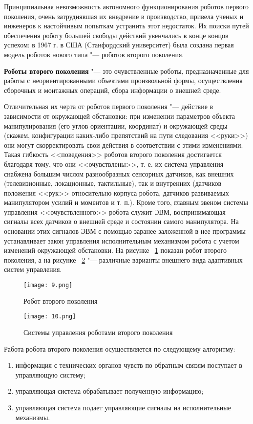 \documentclass[bachelor, och, referat]{SCWorks}
\begin{document}
Принципиальная невозможность автономного функционирования роботов первого
поколения, очень затруднявшая их внедрение в производство, привела ученых и
инженеров к настойчивым попыткам устранить этот недостаток. Их поиски путей
обеспечения роботу большей свободы действий увенчались в конце концов успехом: в
1967 г. в США (Станфордский университет) была создана первая модель роботов
нового типа "--- роботов второго поколения.

\textbf{Роботы второго поколения} "--- это очувствленные роботы, предназначенные
для работы с неориентированными объектами произвольной формы, осуществления
сборочных и монтажных операций, сбора информации о внешней среде.

Отличительная их черта от роботов первого поколения "--- действие в зависимости
от окружающей обстановки: при изменении параметров объекта манипулирования (его
углов ориентации, координат) и окружающей среды (скажем, конфигурации каких-либо
препятствий на пути следования <<руки>>) они могут скорректировать свои действия
в соответствии с этими изменениями. Такая гибкость <<поведения>> роботов второго
поколения достигается благодаря тому, что они <<очувствлены>>, т. е. их система
управления снабжена большим числом разнообразных сенсорных датчиков, как внешних
(телевизионные, локационные, тактильные), так и внутренних (датчиков положения
<<рук>> относительно корпуса робота, датчиков развиваемых манипулятором усилий и
моментов и т. п.). Кроме того, главным звеном системы управления
<<очувствленного>> робота служит ЭВМ, воспринимающая сигналы всех датчиков о
внешней среде и состоянии самого манипулятора. На основании этих сигналов ЭВМ с
помощью заранее заложенной в нее программы устанавливает закон управления
исполнительным механизмом робота с учетом изменений окружающей обстановки. На
рисунке ~\ref{fig:9} показан робот второго поколения, а на рисунке ~\ref{fig:10}
"--- различные варианты внешнего вида адаптивных систем управления.

\begin{figure}[h!]
    \centering
    \texttt{[image: 9.png]}
    \caption{\label{fig:9}%
    Робот второго поколения}
\end{figure}

\begin{figure}[h!]
    \centering
    \texttt{[image: 10.png]}
    \caption{\label{fig:10}%
    Системы управления роботами второго поколения}
\end{figure}

Работа робота второго поколения осуществляется по следующему алгоритму:
\begin{enumerate}
    \item информация с технических органов чувств по обратным связям поступает
    в управляющую систему; 
    \item управляющая система обрабатывает полученную информацию;
    \item управляющая система подает управляющие сигналы на исполнительные
    механизмы.
\end{enumerate}
\end{document}
